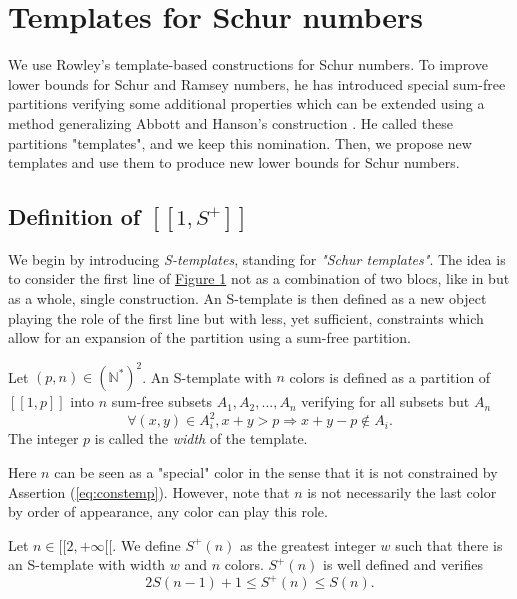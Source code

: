 \section{Templates for Schur numbers}
\label{Schur}

We use Rowley's template-based constructions \cite{RowleyRamsey} for Schur 
numbers. To improve lower bounds for Schur and Ramsey numbers, he has introduced special sum-free 
partitions verifying some additional properties which can be extended using a method generalizing Abbott and 
Hanson's construction \cite{AbbottHanson}. He called these partitions "templates", and we keep this nomination. 
Then, we propose new templates and use them to produce new lower bounds for Schur numbers.

\subsection{Definition of \( [\![ 1, S^+ ]\!] \)}

We begin by introducing \textit{S-templates}, standing for \textit{"Schur templates"}. The idea is to consider the first line
of \hyperref[figure:1]{Figure 1} not as a combination of two blocs, like in \cite{AbbottHanson} but as a whole, single construction. 
An S-template is then defined as a new object playing the role of the first line but with less, yet sufficient, 
constraints which allow for an expansion of the partition using a sum-free partition.

\begin{definition}
Let \((p,n) \in (\mathbb{N}^*)^2\). An S-template with \(n\) colors is defined as a partition of 
\([\![1,p]\!]\) into \(n\) sum-free subsets \(A_1, A_2, ..., A_n\) verifying for all subsets but \(A_n\)
\begin{equation}
\label{eq:constemp}
\forall (x,y) \in A_i^2, x+y > p
\Longrightarrow x+y-p \notin A_i.
\end{equation}
The integer \(p\) is called the \textit{width} of the template.
\end{definition}

Here \(n\) can be seen as a "special" color in the sense that it is not constrained by Assertion (\ref{eq:constemp}).
However, note that \(n\) is not necessarily the last color by order of appearance, any color can play this role.


\begin{proposition}
	Let \(n \in [\![2, +\infty[\![\). We define \(S^+(n)\) as the greatest integer \(w\) such that there is an S-template with 
	width \(w\) and \(n\) colors. 
	\(S^+(n)\) is well defined and verifies
	\[
	2S(n-1)+1 \leqslant S^+(n) \leqslant S(n).
	\]
\end{proposition}

